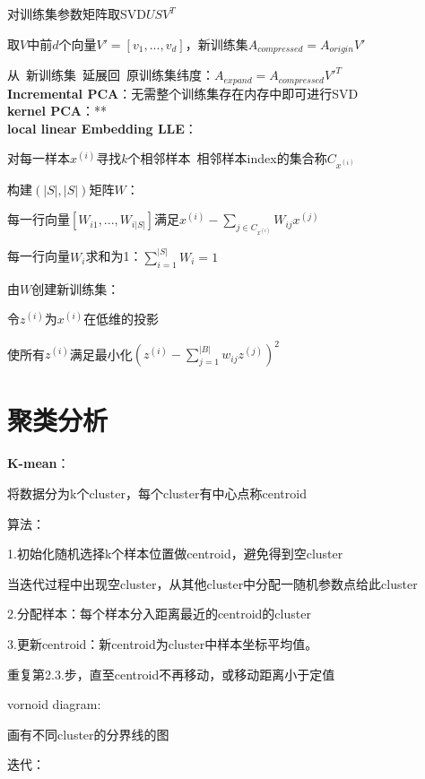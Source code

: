 \documentclass[UTF8]{ctexart}
\begin{document}
  对训练集参数矩阵取SVD$USV^T$

  取$V$中前$d$个向量$V' = [v_1, ..., v_d]$，新训练集$A_{compressed} = A_{origin}V'$
  
  从\ 新训练集\ 延展回\ 原训练集纬度：$A_{expand} = A_{compressed}V'^T$\\
\textbf{Incremental PCA}：无需整个训练集存在内存中即可进行SVD\\
\textbf{kernel PCA}：**\\
\textbf{local linear Embedding LLE}：
  
  对每一样本$x^{(i)}$寻找$k$个相邻样本\ 相邻样本index的集合称$C_{x^{(i)}}$
  
  构建$(|S|, |S|)$矩阵$W$：
  
  \quad 每一行向量$[W_{i1}, ..., W_{i|S|}]$满足$x^{(i)} - \sum_{j \in C_{x^{(i)}}} W_{ij}x^{(j)}$
  
  \quad 每一行向量$W_i$求和为1：$\sum_{i=1}^{|S|}W_i = 1$

  由$W$创建新训练集：

  \quad 令$z^{(i)}$为$x^{(i)}$在低维的投影

  \quad 使所有$z^{(i)}$满足最小化$(z^{(i)} - \sum_{j=1}^{|B|}w_{ij}z^{(j)})^2$

\section{聚类分析}
\noindent \textbf{K-mean}：

  将数据分为k个cluster，每个cluster有中心点称centroid
  
  算法：
  
  \quad 1.初始化随机选择k个样本位置做centroid，避免得到空cluster

  \quad \quad 当迭代过程中出现空cluster，从其他cluster中分配一随机参数点给此cluster

  \quad 2.分配样本：每个样本分入距离最近的centroid的cluster

  \quad 3.更新centroid：新centroid为cluster中样本坐标平均值。
  
  \quad 重复第2.3.步，直至centroid不再移动，或移动距离小于定值

  vornoid diagram:

  \quad 画有不同cluster的分界线的图

  迭代：
  
\end{document}

